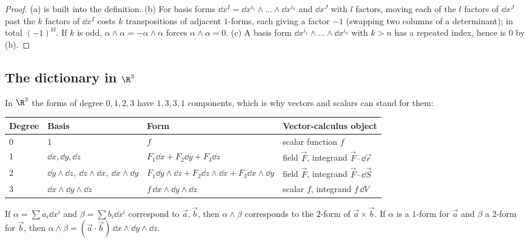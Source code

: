 \begin{proof}
(a) is built into the definition. (b) For basis forms $\dd x^I=\dd x^{i_1}\wedge\dots\wedge\dd x^{i_k}$ and $\dd x^J$ with $l$ factors, moving each of the $l$ factors of $\dd x^J$ past the $k$ factors of $\dd x^I$ costs $k$ transpositions of adjacent $1$-forms, each giving a factor $-1$ (swapping two columns of a determinant); in total $(-1)^{kl}$. If $k$ is odd, $\alpha\wedge\alpha=-\alpha\wedge\alpha$ forces $\alpha\wedge\alpha=0$. (c) A basis form $\dd x^{i_1}\wedge\dots\wedge\dd x^{i_k}$ with $k>n$ has a repeated index, hence is $0$ by (b).
\end{proof}

\subsection{The dictionary in $\R^3$}

In $\R^3$ the forms of degree $0,1,2,3$ have $1,3,3,1$ components, which is why vectors and scalars can stand for them:

\begin{center}
\renewcommand{\arraystretch}{1.35}
\begin{tabular}{llll}
\toprule
\textbf{Degree} & \textbf{Basis} & \textbf{Form} & \textbf{Vector-calculus object} \\
\midrule
0 & $1$ & $f$ & scalar function $f$ \\
1 & $\dd x,\dd y,\dd z$ & $F_1\dd x+F_2\dd y+F_3\dd z$ & field $\vec F$, integrand $\vec F\cdot\dd\vec r$ \\
2 & $\dd y\wedge\dd z,\ \dd z\wedge\dd x,\ \dd x\wedge\dd y$ & $F_1\dd y\wedge\dd z+F_2\dd z\wedge\dd x+F_3\dd x\wedge\dd y$ & field $\vec F$, integrand $\vec F\cdot\dd\vec S$ \\
3 & $\dd x\wedge\dd y\wedge\dd z$ & $f\,\dd x\wedge\dd y\wedge\dd z$ & scalar $f$, integrand $f\,\dd V$ \\
\bottomrule
\end{tabular}
\end{center}

\begin{proposition}\label{prop:wedgedict}
If $\alpha=\sum a_i\dd x^i$ and $\beta=\sum b_i\dd x^i$ correspond to $\vec a,\vec b$, then $\alpha\wedge\beta$ corresponds to the $2$-form of $\vec a\times\vec b$. If $\alpha$ is a $1$-form for $\vec a$ and $\beta$ a $2$-form for $\vec b$, then $\alpha\wedge\beta=(\vec a\cdot\vec b)\,\dd x\wedge\dd y\wedge\dd z$.
\end{proposition}

